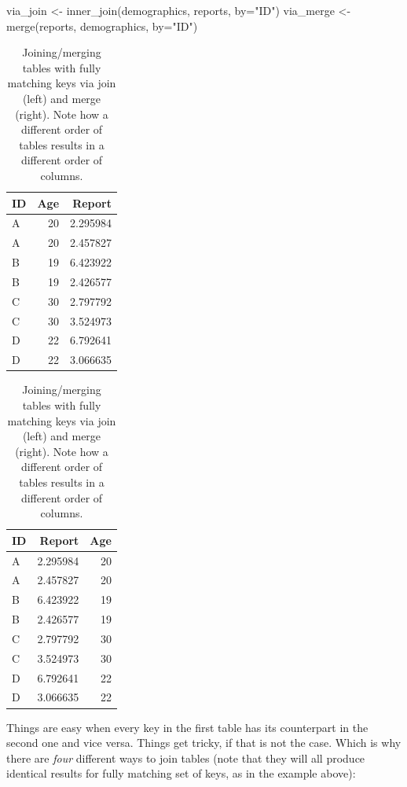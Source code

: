 \documentclass[
]{book}
\newenvironment{Shaded}{\begin{snugshade}}{\end{snugshade}}
\newcommand{\AttributeTok}[1]{\textcolor[rgb]{0.77,0.63,0.00}{#1}}
\newcommand{\FunctionTok}[1]{\textcolor[rgb]{0.00,0.00,0.00}{#1}}
\newcommand{\NormalTok}[1]{#1}
\newcommand{\OtherTok}[1]{\textcolor[rgb]{0.56,0.35,0.01}{#1}}
\newcommand{\StringTok}[1]{\textcolor[rgb]{0.31,0.60,0.02}{#1}}
\begin{document}
\begin{Shaded}
\begin{Highlighting}[]
\NormalTok{via\_join }\OtherTok{\textless{}{-}} \FunctionTok{inner\_join}\NormalTok{(demographics, reports, }\AttributeTok{by=}\StringTok{"ID"}\NormalTok{)}
\NormalTok{via\_merge }\OtherTok{\textless{}{-}} \FunctionTok{merge}\NormalTok{(reports, demographics, }\AttributeTok{by=}\StringTok{"ID"}\NormalTok{)}
\end{Highlighting}
\end{Shaded}

\begin{table}
\caption{\label{tab:unnamed-chunk-177}Joining/merging tables with fully matching keys via join (left) and merge (right). Note how a different order of tables results in a different order of columns.}

\centering
\begin{tabular}[t]{l|r|r}
\hline
ID & Age & Report\\
\hline
A & 20 & 2.295984\\
\hline
A & 20 & 2.457827\\
\hline
B & 19 & 6.423922\\
\hline
B & 19 & 2.426577\\
\hline
C & 30 & 2.797792\\
\hline
C & 30 & 3.524973\\
\hline
D & 22 & 6.792641\\
\hline
D & 22 & 3.066635\\
\hline
\end{tabular}
\centering
\begin{tabular}[t]{l|r|r}
\hline
ID & Report & Age\\
\hline
A & 2.295984 & 20\\
\hline
A & 2.457827 & 20\\
\hline
B & 6.423922 & 19\\
\hline
B & 2.426577 & 19\\
\hline
C & 2.797792 & 30\\
\hline
C & 3.524973 & 30\\
\hline
D & 6.792641 & 22\\
\hline
D & 3.066635 & 22\\
\hline
\end{tabular}
\end{table}

Things are easy when every key in the first table has its counterpart in the second one and vice versa. Things get tricky, if that is not the case. Which is why there are \emph{four} different ways to join tables (note that they will all produce identical results for fully matching set of keys, as in the example above):
\end{document}
